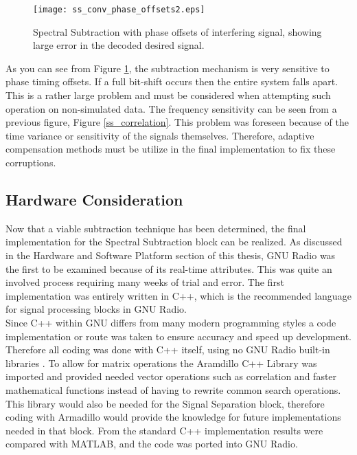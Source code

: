 \begin{figure}[!ht]
\centering
\texttt{[image: ss\_conv\_phase\_offsets2.eps]}
\caption{Spectral Subtraction with phase offsets of interfering signal, showing large error in the decoded desired signal.}
\label{shifting}
\end{figure}

As you can see from Figure \ref{shifting}, the subtraction mechanism is very sensitive to phase timing offsets.  If a full bit-shift occurs then the entire system falls apart.  This is a rather large problem and must be considered when attempting such operation on non-simulated data.  The frequency sensitivity can be seen from a previous figure, Figure \ref{ss_correlation}.  This problem was foreseen because of the time variance or sensitivity of the signals themselves.  Therefore, adaptive compensation methods must be utilize in the final implementation to fix these corruptions.\\

\subsection{Hardware Consideration}

Now that a viable subtraction technique has been determined, the final implementation for the Spectral Subtraction block can be realized.  As discussed in the Hardware and Software Platform section of this thesis, GNU Radio was the first to be examined because of its real-time attributes.  This was quite an involved process requiring many weeks of trial and error.  The first implementation was entirely written in C++, which is the recommended language for signal processing blocks in GNU Radio.\\  

Since C++ within GNU differs from many modern programming styles a code implementation or route was taken to ensure accuracy and speed up development.  Therefore all coding was done with C++ itself, using no GNU Radio built-in libraries \cite{gnuradioCPP}.  To allow for matrix operations the Aramdillo C++ Library \cite{armadillo} was imported and provided needed vector operations such as correlation and faster mathematical functions instead of having to rewrite common search operations.  This library would also be needed for the Signal Separation block, therefore coding with Armadillo would provide the knowledge for future implementations needed in that block.  From the standard C++ implementation results were compared with MATLAB, and the code was ported into GNU Radio.\\

